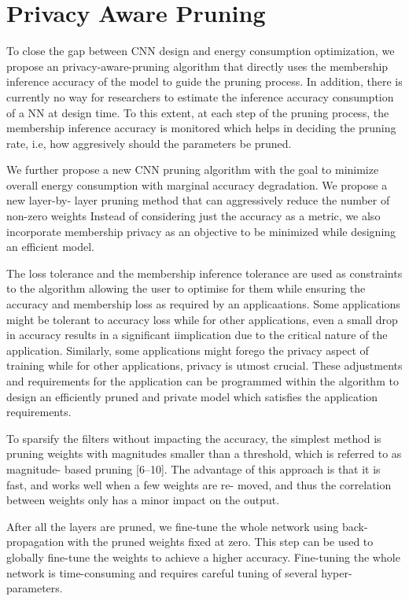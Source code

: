 \section{Privacy Aware Pruning}

To close the gap between CNN design and energy consumption optimization, we propose an privacy-aware-pruning algorithm that directly uses the membership inference accuracy of the model to guide the pruning process.
In addition, there is currently no way for researchers to estimate the inference accuracy consumption of a NN at design time.
To this extent, at each step of the pruning process, the membership inference accuracy is monitored which helps in deciding the pruning rate, i.e, how aggresively should the parameters be pruned.

We further propose a new CNN pruning algorithm with the goal to minimize overall energy consumption with marginal accuracy degradation.
We propose a new layer-by- layer pruning method that can aggressively reduce the number of non-zero weights
Instead of considering just the accuracy as a metric, we also incorporate membership privacy as an objective to be minimized while designing an efficient model.




The loss tolerance and the membership inference tolerance are used as constraints to the algorithm allowing the user to optimise for them while ensuring the accuracy and membership loss as required by an applicaations.
Some applications might be tolerant to accuracy loss while for other applications, even a small drop in accuracy results in a significant iimplication due to the critical nature of the application.
Similarly, some applications might forego the privacy aspect of training while for other applications, privacy is utmost crucial.
These adjustments and requirements for the application can be programmed within the algorithm to design an efficiently pruned and private model which satisfies the application requirements.

To sparsify the filters without impacting the accuracy, the simplest method is pruning weights with magnitudes smaller than a threshold, which is referred to as magnitude- based pruning [6–10]. The advantage of this approach is that it is fast, and works well when a few weights are re- moved, and thus the correlation between weights only has a minor impact on the output.

After all the layers are pruned, we fine-tune the whole network using back-propagation with the pruned weights fixed at zero. This step can be used to globally fine-tune the weights to achieve a higher accuracy. Fine-tuning the whole network is time-consuming and requires careful tuning of several hyper-parameters.
